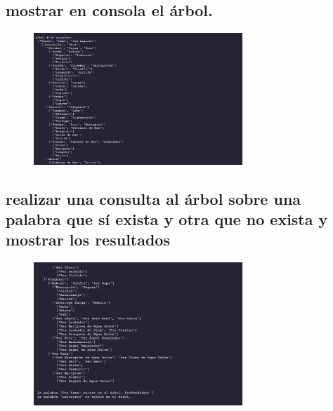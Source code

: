 \subsection{mostrar en consola el árbol.}

\begin{figure}[ht]
  \centering
  \includegraphics[width=0.7\textwidth]{./src/img/arbol/image1.png}
\end{figure}

\subsection{realizar una consulta al árbol sobre una palabra que sí exista y otra que no exista y mostrar los resultados}

\begin{figure}[ht]
  \centering
  \includegraphics[width=0.7\textwidth]{./src/img/arbol/image2.png}
\end{figure}